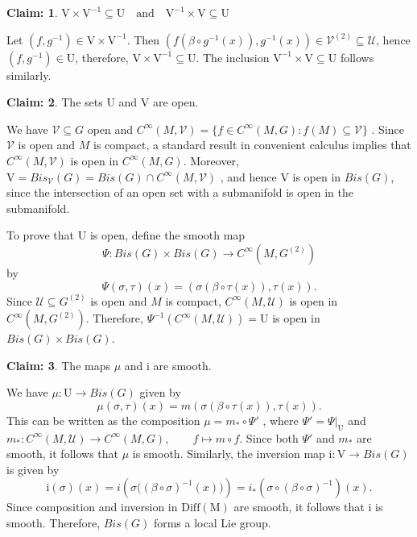 \documentclass[12pt,a4paper]{amsart}
\makeatletter
\theoremstyle{plain}
\theoremstyle{definition}
\newtheorem*{claim}{Claim:}
\renewenvironment{proof}[1][\proofname]{%
  \par\vspace{0.1em} %
  \pushQED{\qed}%
  \normalfont \topsep0pt \trivlist
  \item[\hskip\labelsep\itshape #1\@addpunct{.}]\ignorespaces
}{%
  \popQED\endtrivlist\@endpefalse
}
\makeatother
\begin{document}
\begin{proof}
\begin{itemize}
\end{itemize}

\begin{claim}

$\mathrm V\times \mathrm V^{-1}\subseteq \mathrm U
\quad \text{and} \quad
\mathrm V^{-1}\times \mathrm V\subseteq \mathrm U$
\end{claim}
Let $(f,g^{-1}) \in \mathrm V\times \mathrm V^{-1}$. Then
$ (f(\beta \circ g^{-1}(x)), g^{-1}(x))
\in
\mathcal V^{(2)}
\subseteq
\mathcal U$,
 hence $(f,g^{-1}) \in \mathrm U$, therefore, $\mathrm V\times \mathrm V^{-1}\subseteq \mathrm U$.
The inclusion
$\mathrm V^{-1}\times \mathrm V\subseteq \mathrm U$
follows similarly.
\begin{claim}
The sets $\mathrm U$ and $\mathrm V$ are open.
\end{claim}



We have $\mathcal V\subseteq G$ open and $C^\infty(M,\mathcal V)
=
\{f\in C^\infty(M,G):f(M)\subseteq \mathcal V\}$ .
Since $\mathcal V$ is open and $M$ is compact, a standard result in convenient calculus implies that
$C^\infty(M,\mathcal V)$ 
is open in $C^\infty(M,G)$. Moreover,
$\mathrm V
=
Bis_{\mathcal V}(G)
=
Bis(G)\cap C^\infty(M,\mathcal V)$ ,
and hence $\mathrm V$ is open in $Bis(G)$, since the intersection of an open set with a submanifold is open in the submanifold.

To prove that $\mathrm U$ is open, define the smooth map
\[
\Psi:Bis(G)\times Bis(G)\to C^\infty(M,G^{(2)})
\]
by
\[
\Psi(\sigma,\tau)(x)
=
(\sigma(\beta\circ\tau(x)),\tau(x)).
\]
Since $\mathcal U\subseteq G^{(2)}$ is open and $M$ is compact,
$C^\infty(M,\mathcal U)$ 
is open in $C^\infty(M,G^{(2)})$. Therefore,
$\Psi^{-1}(C^\infty(M,\mathcal U))
=
\mathrm U$
is open in $Bis(G)\times Bis(G)$.


    
\begin{claim}
The maps $\mu$ and $\mathrm i$ are smooth.
\end{claim}

We have
$\mu:\mathrm U\to Bis(G)$ 
given by
\[\mu(\sigma,\tau)(x)
=
m(\sigma(\beta\circ\tau(x)),\tau(x)).
\]
This can be written as the composition
$\mu
=
m_*\circ \Psi'$ ,
where $\Psi'=\Psi|_{\mathrm U}$ and
$ m_*:C^\infty(M,\mathcal U)\to C^\infty(M,G),
\qquad
f\mapsto m\circ f$.
Since both $\Psi'$ and $m_*$ are smooth, it follows that $\mu$ is smooth.
Similarly, the inversion map
$\mathrm i:\mathrm V\to Bis(G)$ 
is given by
\[
\mathrm i(\sigma)(x)
=
i\!\left(
\sigma\bigl((\beta\circ\sigma)^{-1}(x)\bigr)
\right)=i_* (\sigma \circ (\beta \circ \sigma)^{-1})(x).
\]
Since composition and inversion in $\mathrm{Diff(M)}$ are smooth, it follows that $\mathrm i$ is smooth.
Therefore, $Bis(G)$ forms a local Lie group.
  
\end{proof}
\end{document}

